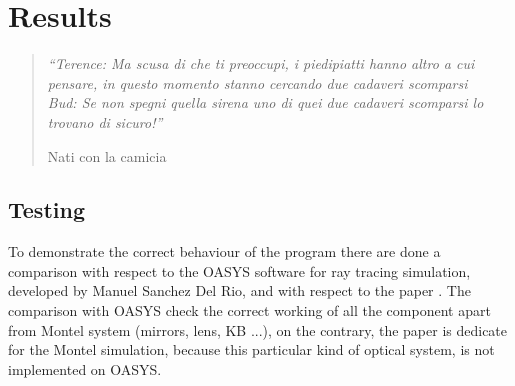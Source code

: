 \chapter{Results}
\label{capitolo4}


\begin{quotation}
{\footnotesize
\noindent \emph{``Terence: Ma scusa di che ti preoccupi, i piedipiatti hanno altro a cui pensare, in questo momento stanno cercando due cadaveri scomparsi \\
Bud: Se non spegni quella sirena uno di quei due cadaveri scomparsi lo trovano di sicuro!''}
\begin{flushright}
Nati con la camicia
\end{flushright}
}
\end{quotation}
\vspace{0.5cm}

\section{Testing}
To demonstrate the correct behaviour of the program there are done a comparison  with respect to the OASYS software for ray tracing simulation, developed by Manuel Sanchez Del Rio, and with respect to the  paper \cite{resta2015nested}. The comparison with OASYS check the correct working of all the component apart from Montel system (mirrors, lens, KB ...), on the contrary, the paper is dedicate for the Montel simulation, because this particular kind of optical system, is not implemented on OASYS.
%
